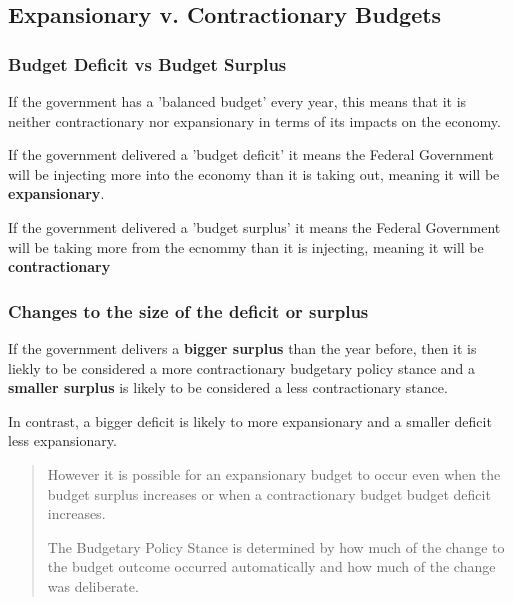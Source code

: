 \documentclass[11pt]{article}
\begin{document}
\subsection{Expansionary v. Contractionary Budgets}
\label{sec-1-8}


\subsubsection{Budget Deficit vs Budget Surplus}
\label{sec-1-8-1}

If the government has a 'balanced budget' every year, this means that
it is neither contractionary nor expansionary in terms of its impacts
on the economy.

If the government delivered a 'budget deficit' it means the Federal
Government will be injecting more into the economy than it is taking
out, meaning it will be \textbf{expansionary}.

If the government delivered a 'budget surplus' it means the Federal
Government will be taking more from the ecnommy than it is injecting,
meaning it will be \textbf{contractionary}

\subsubsection{Changes to the size of the deficit or surplus}
\label{sec-1-8-2}

If the government delivers a \textbf{bigger surplus} than the year before, then
it is liekly to be considered a more contractionary budgetary policy
stance and a \textbf{smaller surplus} is likely to be considered a less
contractionary stance.

In contrast, a bigger deficit is likely to more expansionary and a
smaller deficit less expansionary.

\begin{quote}
However it is possible for an expansionary budget to occur even when
the budget surplus increases or when a contractionary budget budget
deficit increases.

The Budgetary Policy Stance is determined by how much of the change to
the budget outcome occurred automatically and how much of the change
was deliberate.
\end{quote}
\end{document}
